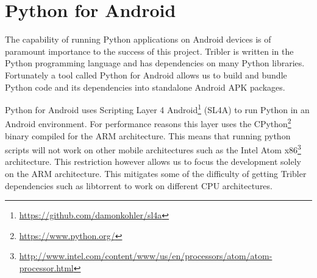 \section{Python for Android}
	\label{sec:p4a}
	The capability of running Python applications on Android devices is of paramount importance to the success of this project. Tribler is written in the Python programming language and has dependencies on many Python libraries. Fortunately a tool called Python for Android allows us to build and bundle Python code and its dependencies into standalone Android APK packages.

	Python for Android uses Scripting Layer 4 Android\footnote{\url{https://github.com/damonkohler/sl4a}} (SL4A) to run Python in an Android environment. For performance reasons this layer uses the CPython\footnote{\url{https://www.python.org/}} binary compiled for the ARM architecture. This means that running python scripts will not work on other mobile architectures such as the Intel Atom x86\footnote{\url{http://www.intel.com/content/www/us/en/processors/atom/atom-processor.html}} architecture. This restriction however allows us to focus the development solely on the ARM architecture. This mitigates some of the difficulty of getting Tribler dependencies such as libtorrent to work on different CPU architectures.
